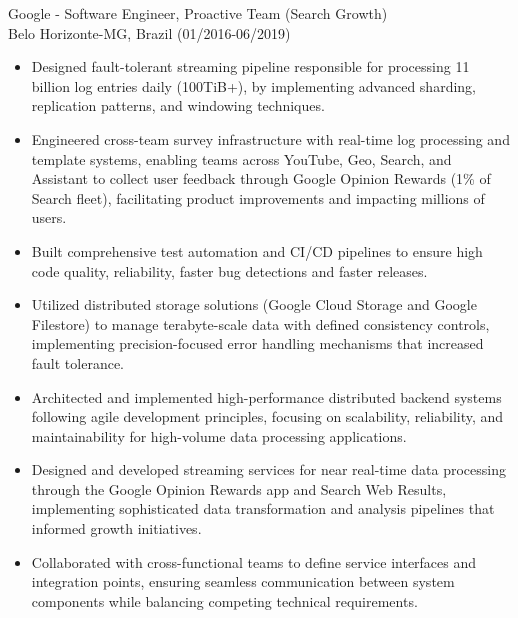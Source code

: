 
\normalsize{Google - Software Engineer, Proactive Team (Search Growth)}\\
        \scriptsize{Belo Horizonte-MG, Brazil (01/2016-06/2019)}
\begin{itemize}
    \item \scriptsize{Designed fault-tolerant streaming pipeline responsible for processing 11 billion
        log entries daily (100TiB+), by implementing advanced sharding, replication patterns, and windowing techniques.}

    \item \scriptsize{Engineered cross-team survey infrastructure with real-time log processing and
        template systems, enabling teams across YouTube, Geo, Search, and Assistant to collect user 
        feedback through Google Opinion Rewards (1\% of Search fleet), facilitating product improvements
        and impacting millions of users.}

    \item \scriptsize{Built comprehensive test automation and CI/CD pipelines to ensure high code 
        quality, reliability, faster bug detections and faster releases.}

    \item \scriptsize{Utilized distributed storage solutions (Google Cloud Storage and Google Filestore)
        to manage terabyte-scale data with defined consistency controls, implementing precision-focused
        error handling mechanisms that increased fault tolerance.}

    \item \scriptsize{Architected and implemented high-performance distributed backend systems following 
        agile development principles, focusing on scalability, reliability, and maintainability for 
        high-volume data processing applications.}
        
    \item \scriptsize{Designed and developed streaming services for near real-time data processing
        through the Google Opinion Rewards app and Search Web Results, implementing sophisticated 
        data transformation and analysis pipelines that informed growth initiatives.}
        
    \item \scriptsize{Collaborated with cross-functional teams to define service interfaces and 
        integration points, ensuring seamless communication between system components while balancing 
        competing technical requirements.}
\end{itemize}